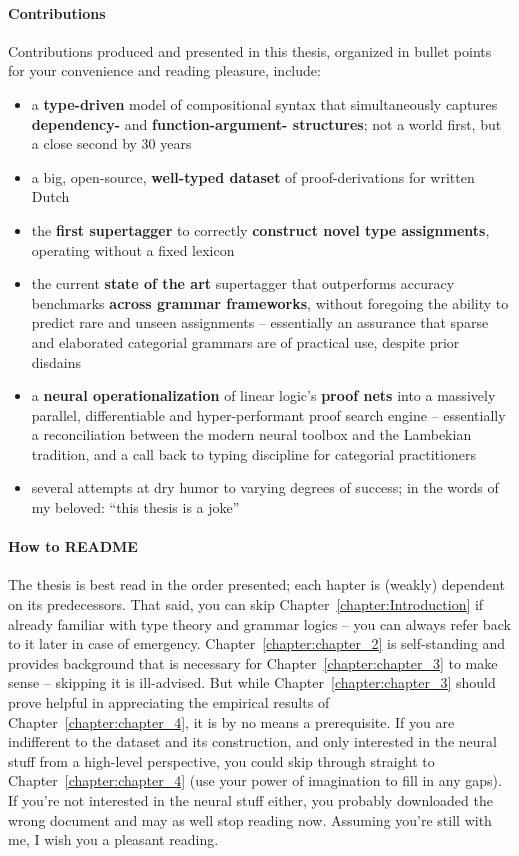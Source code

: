 {\paragraph{Contributions}
Contributions produced and presented in this thesis, organized in bullet points for your convenience and reading pleasure, include:
\begin{itemize}
\item a \textbf{type-driven} model of compositional syntax that simultaneously captures \textbf{dependency-} and \textbf{function-argument- structures}; not a world first, but a close second by 30 years
\item a big, open-source, \textbf{well-typed dataset} of proof-derivations for written Dutch
\item the \textbf{first supertagger} to correctly \textbf{construct novel type assignments}, operating without a fixed lexicon
\item the current \textbf{state of the art} supertagger that outperforms accuracy benchmarks \textbf{across grammar frameworks}, without foregoing the ability to predict rare and unseen assignments -- essentially an assurance that sparse and elaborated categorial grammars are of practical use, despite prior disdains
\item a \textbf{neural operationalization} of linear logic's \textbf{proof nets} into a massively parallel, differentiable and hyper-performant proof search engine -- essentially a reconciliation between the modern neural toolbox and the Lambekian tradition, and a call back to typing discipline for categorial practitioners
\item several attempts at dry humor to varying degrees of success; in the words of my beloved: ``this thesis is a joke''
\end{itemize}

\paragraph{How to README}
The thesis is best read in the order presented; each hapter is (weakly) dependent on its predecessors.
That said, you can skip Chapter~\ref{chapter:Introduction} if already familiar with type theory and grammar logics -- you can always refer back to it later in case of emergency.
Chapter~\ref{chapter:chapter_2} is self-standing and provides background that is necessary for Chapter~\ref{chapter:chapter_3} to make sense -- skipping it is ill-advised.
But while Chapter~\ref{chapter:chapter_3} should prove helpful in appreciating the empirical results of Chapter~\ref{chapter:chapter_4}, it is by no means a prerequisite.
If you are indifferent to the dataset and its construction, and only interested in the neural stuff from a high-level perspective, you could skip through straight to Chapter~\ref{chapter:chapter_4} (use your power of imagination to fill in any gaps).
If you're not interested in the neural stuff either, you probably downloaded the wrong document and may as well stop reading now.
Assuming you're still with me, I wish you a pleasant reading.

}
